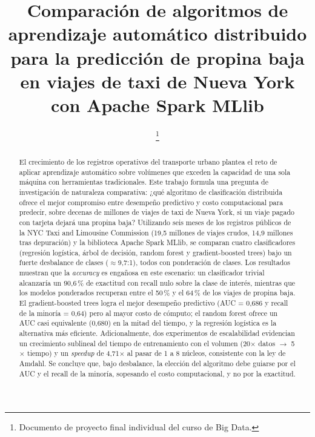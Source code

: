 \documentclass[conference]{IEEEtran}
\begin{document}
\title{Comparación de algoritmos de aprendizaje automático distribuido para la
predicción de propina baja en viajes de taxi de Nueva York con Apache Spark MLlib}

\author{
\thanks{Documento de proyecto final individual del curso de Big Data.}}

\maketitle

\begin{abstract}
El crecimiento de los registros operativos del transporte urbano plantea el reto
de aplicar aprendizaje automático sobre volúmenes que exceden la capacidad de una
sola máquina con herramientas tradicionales. Este trabajo formula una pregunta de
investigación de naturaleza comparativa: ¿qué algoritmo de clasificación
distribuida ofrece el mejor compromiso entre desempeño predictivo y costo
computacional para predecir, sobre decenas de millones de viajes de taxi de Nueva
York, si un viaje pagado con tarjeta dejará una propina baja? Utilizando seis
meses de los registros públicos de la NYC Taxi and Limousine Commission
(19{,}5 millones de viajes crudos, 14{,}9 millones tras depuración) y la
biblioteca Apache Spark MLlib, se comparan cuatro clasificadores (regresión
logística, árbol de decisión, random forest y gradient-boosted trees) bajo un
fuerte desbalance de clases ($\approx$9{,}7:1), todos con ponderación de clases.
Los resultados muestran que la \emph{accuracy} es engañosa en este escenario: un
clasificador trivial alcanzaría un 90{,}6\,\% de exactitud con recall nulo sobre la
clase de interés, mientras que los modelos ponderados recuperan entre el 50\,\% y
el 64\,\% de los viajes de propina baja. El gradient-boosted trees logra el mejor
desempeño predictivo (AUC = 0{,}686 y recall de la minoría = 0{,}64) pero al mayor
costo de cómputo; el random forest ofrece un AUC casi equivalente (0{,}680) en la
mitad del tiempo, y la regresión logística es la alternativa más eficiente.
Adicionalmente, dos experimentos de escalabilidad evidencian un crecimiento
sublineal del tiempo de entrenamiento con el volumen (20$\times$ datos
$\rightarrow$ 5$\times$ tiempo) y un \emph{speedup} de 4{,}71$\times$ al pasar de 1
a 8 núcleos, consistente con la ley de Amdahl. Se concluye que, bajo desbalance, la
elección del algoritmo debe guiarse por el AUC y el recall de la minoría,
sopesando el costo computacional, y no por la exactitud.
\end{abstract}
\end{document}
